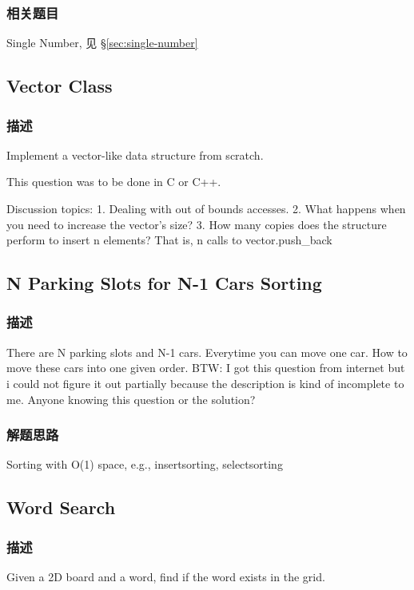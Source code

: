 \subsubsection{相关题目}
\begindot
\item  Single Number, 见 \S \ref{sec:single-number}
\myenddot

\subsection{Vector Class}
\subsubsection{描述}
Implement a vector-like data structure from scratch. 

This question was to be done in C or C++. 

Discussion topics: 
1. Dealing with out of bounds accesses. 
2. What happens when you need to increase the vector's size? 
3. How many copies does the structure perform to insert n elements? That is, n 
calls to vector.push_back

\subsection{N Parking Slots for N-1 Cars Sorting}
\label{sec:npark}
\subsubsection{描述}
There are N parking slots and N-1 cars. Everytime you can move one car. How to move these cars into one given order. 
BTW: I got this question from internet but i could not figure it out partially because the description is kind of incomplete to me. Anyone knowing this question or the solution?
\subsubsection{解题思路}
Sorting with O(1) space, e.g., insertsorting, selectsorting

\subsection{Word Search}
\label{sec:wordsearch}
\subsubsection{描述}
Given a 2D board and a word, find if the word exists in the grid.

